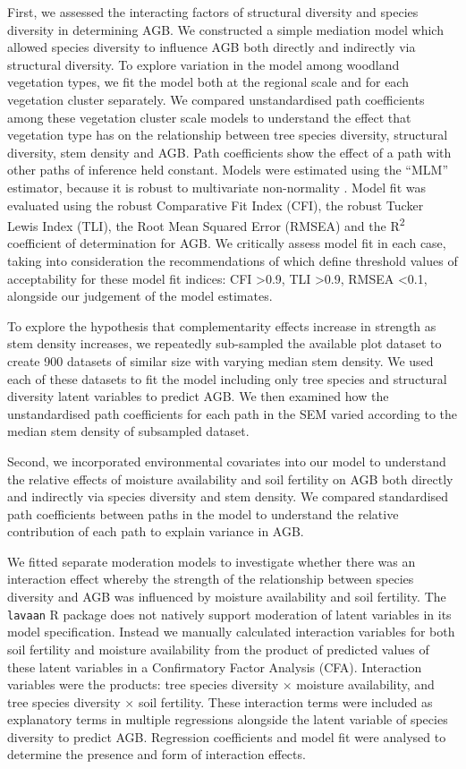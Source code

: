 \documentclass[11pt,a4paper]{article}
\begin{document}
First, we assessed the interacting factors of structural diversity and species diversity in determining AGB. We constructed a simple mediation model which allowed species diversity to influence AGB both directly and indirectly via structural diversity. To explore variation in the model among woodland vegetation types, we fit the model both at the regional scale and for each vegetation cluster separately. We compared unstandardised path coefficients among these vegetation cluster scale models to understand the effect that vegetation type has on the relationship between tree species diversity, structural diversity, stem density and AGB. Path coefficients show the effect of a path with other paths of inference held constant. Models were estimated using the ``MLM'' estimator, because it is robust to multivariate non-normality \citep{Shapiro1983}. Model fit was evaluated using the robust Comparative Fit Index (CFI), the robust Tucker Lewis Index (TLI), the Root Mean Squared Error (RMSEA) and the R\textsuperscript{2} coefficient of determination for AGB. We critically assess model fit in each case, taking into consideration the recommendations of \citet{Hu1999} which define threshold values of acceptability for these model fit indices: CFI >0.9, TLI >0.9, RMSEA <0.1, alongside our judgement of the model estimates.


To explore the hypothesis that complementarity effects increase in strength as stem density increases, we repeatedly sub-sampled the available plot dataset to create 900 datasets of similar size with varying median stem density. We used each of these datasets to fit the model including only tree species and structural diversity latent variables to predict AGB. We then examined how the unstandardised path coefficients for each path in the SEM varied according to the median stem density of subsampled dataset.

Second, we incorporated environmental covariates into our model to understand the relative effects of moisture availability and soil fertility on AGB both directly and indirectly via species diversity and stem density. We compared standardised path coefficients between paths in the model to understand the relative contribution of each path to explain variance in AGB.

We fitted separate moderation models to investigate whether there was an interaction effect whereby the strength of the relationship between species diversity and AGB was influenced by moisture availability and soil fertility. The \verb|lavaan| R package does not natively support moderation of latent variables in its model specification. Instead we manually calculated interaction variables for both soil fertility and moisture availability from the product of predicted values of these latent variables in a Confirmatory Factor Analysis (CFA). Interaction variables were the products: tree species diversity $\times$ moisture availability, and tree species diversity $\times$ soil fertility. These interaction terms were included as explanatory terms in multiple regressions alongside the latent variable of species diversity to predict AGB. Regression coefficients and model fit were analysed to determine the presence and form of interaction effects.
\end{document}
